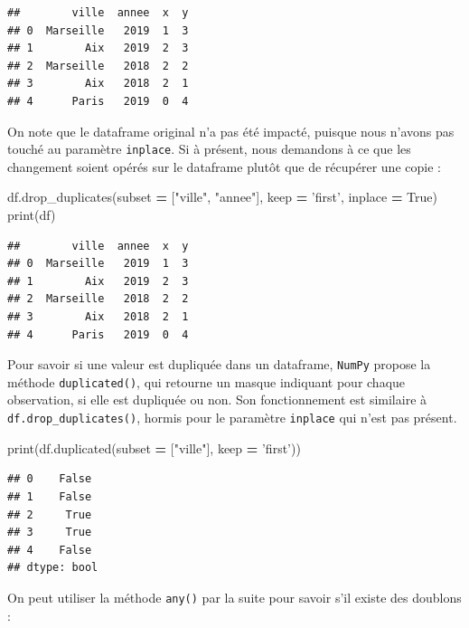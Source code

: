 \documentclass[12pt,]{book}
\newenvironment{Shaded}{\begin{snugshade}}{\end{snugshade}}
\newcommand{\StringTok}[1]{\textcolor[rgb]{0.31,0.60,0.02}{#1}}
\newcommand{\VariableTok}[1]{\textcolor[rgb]{0.00,0.00,0.00}{#1}}
\newcommand{\OperatorTok}[1]{\textcolor[rgb]{0.81,0.36,0.00}{\textbf{#1}}}
\newcommand{\BuiltInTok}[1]{#1}
\newcommand{\NormalTok}[1]{#1}
\numberwithin{equation}{section}
\numberwithin{countremarque}{section}
\begin{document}
\begin{lstlisting}
##        ville  annee  x  y
## 0  Marseille   2019  1  3
## 1        Aix   2019  2  3
## 2  Marseille   2018  2  2
## 3        Aix   2018  2  1
## 4      Paris   2019  0  4
\end{lstlisting}

On note que le dataframe original n'a pas été impacté, puisque nous
n'avons pas touché au paramètre \texttt{inplace}. Si à présent, nous
demandons à ce que les changement soient opérés sur le dataframe plutôt
que de récupérer une copie :

\begin{Shaded}
\begin{Highlighting}[]
\NormalTok{df.drop_duplicates(subset }\OperatorTok{=}\NormalTok{ [}\StringTok{"ville"}\NormalTok{, }\StringTok{"annee"}\NormalTok{], keep }\OperatorTok{=} \StringTok{'first'}\NormalTok{, inplace }\OperatorTok{=} \VariableTok{True}\NormalTok{)}
\BuiltInTok{print}\NormalTok{(df)}
\end{Highlighting}
\end{Shaded}

\begin{lstlisting}
##        ville  annee  x  y
## 0  Marseille   2019  1  3
## 1        Aix   2019  2  3
## 2  Marseille   2018  2  2
## 3        Aix   2018  2  1
## 4      Paris   2019  0  4
\end{lstlisting}

Pour savoir si une valeur est dupliquée dans un dataframe,
\texttt{NumPy} propose la méthode \texttt{duplicated()}, qui retourne un
masque indiquant pour chaque observation, si elle est dupliquée ou non.
Son fonctionnement est similaire à \texttt{df.drop\_duplicates()},
hormis pour le paramètre \texttt{inplace} qui n'est pas présent.

\begin{Shaded}
\begin{Highlighting}[]
\BuiltInTok{print}\NormalTok{(df.duplicated(subset }\OperatorTok{=}\NormalTok{ [}\StringTok{"ville"}\NormalTok{], keep }\OperatorTok{=} \StringTok{'first'}\NormalTok{))}
\end{Highlighting}
\end{Shaded}

\begin{lstlisting}
## 0    False
## 1    False
## 2     True
## 3     True
## 4    False
## dtype: bool
\end{lstlisting}

On peut utiliser la méthode \texttt{any()} par la suite pour savoir s'il
existe des doublons :
\end{document}
